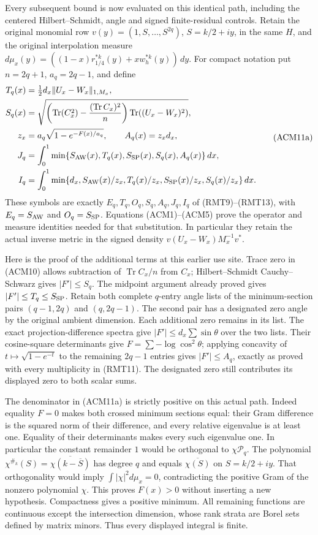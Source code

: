 Every subsequent bound is now evaluated on this identical path, including
the centered Hilbert--Schmidt, angle and signed finite-residual controls.
Retain the original monomial row $v(y)=(1,S,\ldots,S^{2q})$,
$S=k/2+iy$, in the same $H$, and the original interpolation measure
$d\mu_x(y)=((1-x)r_{1/4}^{*k}(y)+xw_h^{*k}(y))\,dy$.
For compact notation put
$n=2q+1$, $a_q=2q-1$, and define
\[
\begin{split}
 T_q(x)&=\tfrac12d_x\|U_x-W_x\|_{1,M_x},\\
 S_q(x)&=\sqrt{\left(\operatorname{Tr}(C_x^2)
       -\frac{(\operatorname{Tr}C_x)^2}{n}\right)
                    \operatorname{Tr}((U_x-W_x)^2)},\\
 z_x&=a_q\sqrt{1-e^{-F(x)/a_q}},\qquad A_q(x)=z_xd_x,\\
 J_q&=\int_0^1\min\{S_{\rm AW}(x),T_q(x),S_{\rm SP}(x),
                                      S_q(x),A_q(x)\}\,dx,\\
 I_q&=\int_0^1\min\{d_x,S_{\rm AW}(x)/z_x,T_q(x)/z_x,
                         S_{\rm SP}(x)/z_x,S_q(x)/z_x\}\,dx.
\end{split}
\tag{ACM11a}
\]
These symbols are exactly $E_q,T_q,O_q,S_q,A_q,J_q,I_q$ of
(RMT9)--(RMT13), with $E_q=S_{\rm AW}$ and $O_q=S_{\rm SP}$.
Equations (ACM1)--(ACM5) prove the operator and measure identities
needed for that substitution. In particular they retain the actual
inverse metric in the signed density $v(U_x-W_x)M_x^{-1}v^*$.

Here is the proof of the additional terms at this earlier use site.
Trace zero in (ACM10) allows subtraction of $\operatorname{Tr}C_x/n$
from $C_x$; Hilbert--Schmidt Cauchy--Schwarz gives $|F'|\leq S_q$.
The midpoint argument already proved gives $|F'|\leq T_q\leq S_{\rm SP}$.
Retain both complete $q$-entry angle lists of the minimum-section
pairs $(q-1,2q)$ and $(q,2q-1)$. The second pair has a designated
zero angle by the original ambient dimension. Each additional zero
remains in its list. The exact projection-difference spectra give
$|F'|\leq d_x\sum\sin\theta$ over the two lists. Their cosine-square
determinants give $F=\sum-\log\cos^2\theta$; applying concavity of
$t\mapsto\sqrt{1-e^{-t}}$ to the remaining $2q-1$ entries gives
$|F'|\leq A_q$, exactly as proved with every multiplicity in
(RMT11). The designated zero still contributes its displayed zero
to both scalar sums.

The denominator in (ACM11a) is strictly positive on this actual path.
Indeed equality $F=0$ makes both crossed minimum sections equal:
their Gram difference is the squared norm of their difference,
and every relative eigenvalue is at least one. Equality of their
determinants makes every such eigenvalue one. In particular the
constant remainder $1$ would be orthogonal to $\chi\mathcal P_q$.
The polynomial $\chi^{\#_k}(S)=\overline{\chi(k-\overline S)}$
has degree $q$ and equals $\overline{\chi(S)}$ on $S=k/2+iy$.
That orthogonality would imply $\int|\chi|^2d\mu_x=0$, contradicting
the positive Gram of the nonzero polynomial $\chi$. This proves
$F(x)>0$ without inserting a new hypothesis. Compactness gives a
positive minimum. All remaining functions are continuous except
the intersection dimension, whose rank strata are Borel sets
defined by matrix minors. Thus every displayed integral is finite.

